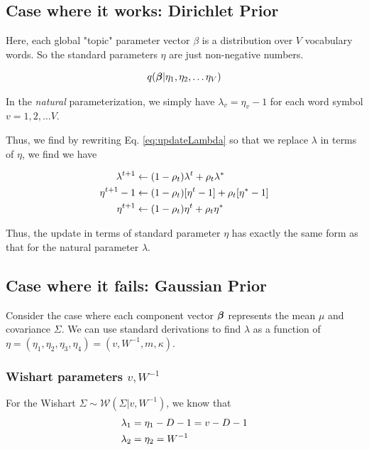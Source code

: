 \documentclass{article}
\newcommand{\BF}[1]{\mbox{\boldmath$#1$}}
\begin{document}
\subsection{Case where it works: Dirichlet Prior}

Here, each global "topic" parameter vector $\beta$ is a distribution over $V$ vocabulary words. So the standard parameters $\eta$ are just non-negative numbers.

\begin{align}
q( \BF{\beta} | \eta_1, \eta_2, \ldots \eta_V )
\end{align}

In the \emph{natural} parameterization, we simply have $\lambda_v = \eta_v-1$ for each word symbol $v = 1,2,\ldots V$.

Thus, we find by rewriting Eq. \ref{eq:updateLambda} so that we replace $\lambda$ in terms of $\eta$, we find we have

\begin{align}
\lambda^{t+1} &\gets (1-\rho_t) \lambda^{t} + \rho_t \lambda^* \notag \\
\eta^{t+1} -1 &\gets  (1-\rho_t) [ \eta^{t}  -1 ] + \rho_t [\eta^* -1 ] \notag \\
\eta^{t+1}  &\gets  (1-\rho_t) \eta^{t}  + \rho_t \eta^* 
\end{align}

Thus, the update in terms of standard parameter $\eta$ has exactly the same form as that for the natural parameter $\lambda$. 

\subsection{Case where it fails: Gaussian Prior}

Consider the case where each component vector $\BF{\beta}$ represents the mean $\mu$ and covariance $\Sigma$.  We can use standard derivations to find $\lambda$ as a function of $\eta = (\eta_1, \eta_2, \eta_3, \eta_4) = (v, W^{-1}, m, \kappa)$.

\subsubsection{Wishart parameters $v, W^{-1}$}

For the Wishart $\Sigma \sim \mathcal{W}( \Sigma | v, W^{-1} )$, we know that
\begin{align}
  \lambda_1 &= \eta_1 - D -1 = v - D - 1 \notag \\
  \lambda_2 &= \eta_2 = W^{-1}
\end{align}
\end{document}
